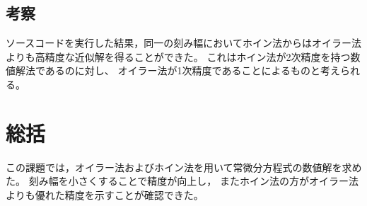 \documentclass[10pt,a4paper,titlepage]{jreport} %
\begin{document}
\subsection{考察}

ソースコードを実行した結果，同一の刻み幅においてホイン法からはオイラー法よりも高精度な近似解を得ることができた。
これはホイン法が2次精度を持つ数値解法であるのに対し、
オイラー法が1次精度であることによるものと考えられる。

\section{総括}

この課題では，オイラー法およびホイン法を用いて常微分方程式の数値解を求めた。
刻み幅を小さくすることで精度が向上し，
またホイン法の方がオイラー法よりも優れた精度を示すことが確認できた。
\end{document}
